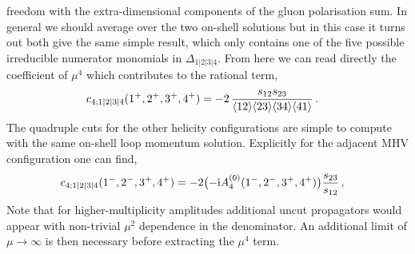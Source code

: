 freedom with the extra-dimensional components of the gluon polarisation sum.
In general we should average over the two on-shell solutions but in this case
it turns out both give the same simple result, which only contains one of the
five possible irreducible numerator monomials in $\Delta_{1|2|3|4}$. From here we can read directly the coefficient of $\mu^4$ which contributes to
the rational term,
\begin{align}
  c_{4;1|2|3|4}(1^+,2^+,3^+,4^+) &= -2 \, \frac{s_{12} s_{23}}{\langle 1 2 \rangle\langle 2 3 \rangle\langle 3 4 \rangle\langle 4 1 \rangle} \,.
\end{align}
The quadruple cuts for the other helicity configurations are simple to compute with the same on-shell loop momentum solution. Explicitly for the adjacent MHV configuration one can find,
\begin{align}
  c_{4;1|2|3|4}(1^-,2^-,3^+,4^+) &= -2 \bigl(-\mathrm{i} A^{(0)}_4(1^-,2^-,3^+,4^+) \bigr) \frac{s_{23}}{s_{12}} \,,
\end{align}
Note that for higher-multiplicity amplitudes additional
uncut propagators would appear with non-trivial $\mu^2$ dependence in the
denominator. An additional limit of $\mu\to \infty$ is then necessary before
extracting the $\mu^4$ term.

